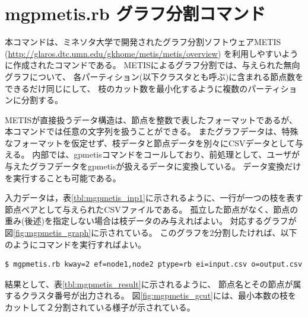 



\section{mgpmetis.rb グラフ分割コマンド\label{sect:mgpmetis}}
本コマンドは、ミネソタ大学で開発されたグラフ分割ソフトウェアMETIS
(\url{http://glaros.dtc.umn.edu/gkhome/metis/metis/overview})
を利用しやすいように作成されたコマンドである。
METISによるグラフ分割では、与えられた無向グラフについて、
各パーティション(以下クラスタとも呼ぶ)に含まれる節点数をできるだけ同じにして、
枝のカット数を最小化するように複数のパーティションに分割する。

METISが直接扱うデータ構造は、節点を整数で表したフォーマットであるが、本コマンドでは任意の文字列を扱うことができる。
またグラフデータは、特殊なフォーマットを仮定せず、枝データと節点データを別々にCSVデータとして与える。
内部では、gpmetisコマンドをコールしており、前処理として、ユーザが与えたグラフデータをgpmetisが扱えるデータに変換している。
データ変換だけを実行することも可能である。

入力データは，表\ref{tbl:mgpmetis_inp1}に示されるように、一行が一つの枝を表す節点ペアとして与えられたCSVファイルである。
孤立した節点がなく、節点の重み(後述)を指定しない場合は枝データのみ与えればよい。
対応するグラフが図\ref{fig:mgpmetis_graph}に示されている。
このグラフを2分割したければ、以下のようにコマンドを実行すればよい。

\begin{verbatim}
$ mgpmetis.rb kway=2 ef=node1,node2 ptype=rb ei=input.csv o=output.csv
\end{verbatim}

結果として、表\ref{tbl:mgpmetis_result}に示されるように、
節点名とその節点が属するクラスタ番号が出力される。
図\ref{fig:mgpmetis_gcut}には、最小本数の枝をカットして２分割されている様子が示されている。

